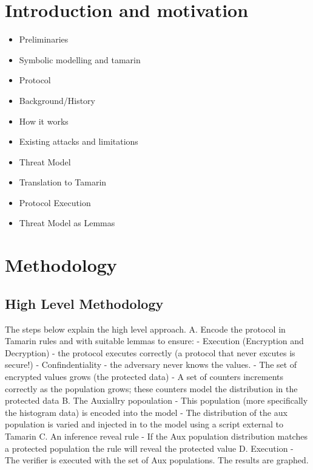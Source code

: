 \documentclass[journal]{IEEEtran}
\begin{document}
\section{Introduction and motivation}
\begin{itemize}
\item Preliminaries
\item 	Symbolic modelling and tamarin
\item Protocol
\item 	Background/History
\item 	How it works
\item 	Existing attacks and limitations
\item Threat Model
\item Translation to Tamarin
\item 	Protocol Execution
\item 	Threat Model as Lemmas
\end{itemize}




\section{Methodology}
\subsection{High Level Methodology}
The steps below explain the high level approach. 
A. Encode the protocol in Tamarin rules and with suitable lemmas to ensure:
	- Execution (Encryption and Decryption) - the protocol executes correctly (a protocol that never excutes is secure!)
	- Confindentiality - the adversary never knows the values.
	- The set of encrypted values grows (the protected data)
	- A set of counters increments correctly as the population grows; these counters model the distribution in the protected data
B. The Auxiallry popoulation
	- This population (more specifically the histogram data) is encoded into the model
	- The distribution of the aux population is varied and injected in to the model using a script external to Tamarin
C. An inference reveal rule
	- If the Aux population distribution matches a protected population the rule will reveal the protected value
D. Execution
	- The \tamarin{} verifier is executed with the set of Aux populations. The results are graphed.
\end{document}
